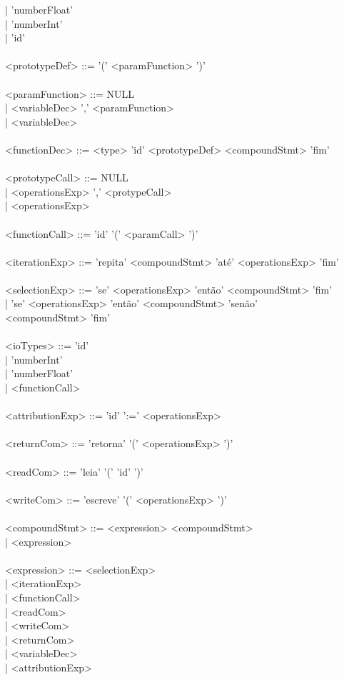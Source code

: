 \documentclass[12pt,a4paper,final]{article}
\newcommand\tab[1][1cm]{\hspace*{#1}}
\begin{document}
\tab \tab | 'numberFloat'\\
\tab \tab | 'numberInt'\\
\tab \tab | 'id'\\
\\
<prototypeDef> ::= '(' <paramFunction> ')'\\
\\
<paramFunction> ::= NULL\\
\tab \tab \tab | <variableDec> ',' <paramFunction>\\
\tab \tab \tab | <variableDec>\\
\\
<functionDec> ::= <type> 'id' <prototypeDef> <compoundStmt> 'fim'\\
\\
<prototypeCall> ::= NULL\\
\tab \tab \tab | <operationsExp> ',' <protypeCall>\\
\tab \tab \tab | <operationsExp>\\
\\
<functionCall> ::= 'id' '(' <paramCall> ')' \\
\\
<iterationExp> ::= 'repita' <compoundStmt> 'até' <operationsExp> 'fim'\\
\\
<selectionExp> ::= 'se' <operationsExp> 'então' <compoundStmt> 'fim'\\
\tab \tab \tab | 'se' <operationsExp> 'então' <compoundStmt> 'senão'\\ <compoundStmt> 'fim'\\
\\
<ioTypes> ::= 'id'\\
\tab \tab | 'numberInt'\\
\tab \tab | 'numberFloat'\\
\tab \tab | <functionCall>\\
\\
<attributionExp> ::= 'id' ':=' <operationsExp>\\
\\
<returnCom> ::= 'retorna' '(' <operationsExp> ')'\\
\\
<readCom> ::= 'leia' '(' 'id' ')'\\
\\
<writeCom> ::= 'escreve' '(' <operationsExp> ')'\\
\\
<compoundStmt> ::= <expression> <compoundStmt>\\
\tab \tab \tab \tab | <expression>\\
\\
<expression> ::= <selectionExp>\\
\tab \tab \tab | <iterationExp>\\
\tab \tab \tab | <functionCall>\\
\tab \tab \tab | <readCom>\\
\tab \tab \tab | <writeCom>\\
\tab \tab \tab | <returnCom>\\
\tab \tab \tab | <variableDec>\\
\tab \tab \tab | <attributionExp>\\
\newpage
\end{document}

